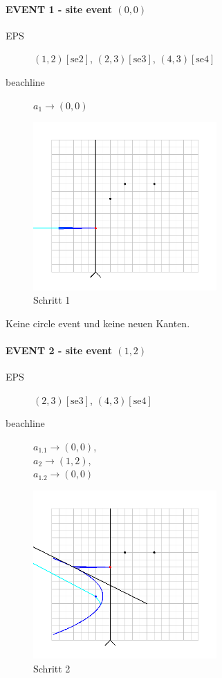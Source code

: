 \paragraph*{EVENT 1 - site event $(0,0)$}
\begin{description}
\item[EPS] $(1,2)[\text{se2}]$, $(2,3)[\text{se3}]$, $(4,3)[\text{se4}]$
\item[beachline] $a_1 \rightarrow (0,0)$
\end{description}

\begin{figure}[h]
\begin{center}
\includegraphics[width=7cm]{capture1}
\end{center}
\caption{Schritt 1}
\label{fig:c1}
\end{figure}

Keine circle event und keine neuen Kanten.

\newpage

\paragraph*{EVENT 2 - site event $(1,2)$}
\begin{description}
\item[EPS] $(2,3)[\text{se3}]$, $(4,3)[\text{se4}]$
\item[beachline]
$a_{1.1} \rightarrow (0,0)$,\\
$a_2 \rightarrow (1,2)$,\\
$a_{1.2} \rightarrow (0,0)$\\
\end{description}

\begin{figure}[h]
\begin{center}
\includegraphics[width=7cm]{capture2}
\end{center}
\caption{Schritt 2}
\label{fig:c2}
\end{figure}

